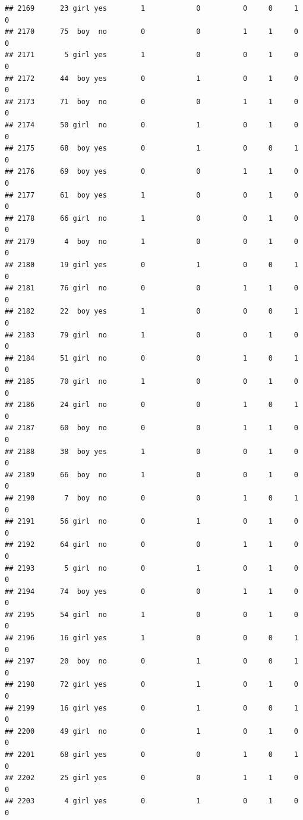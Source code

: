 \documentclass[man]{apa6}
\begin{document}
\begin{verbatim}
## 2169      23 girl yes        1            0          0     0     1     0
## 2170      75  boy  no        0            0          1     1     0     0
## 2171       5 girl yes        1            0          0     1     0     0
## 2172      44  boy yes        0            1          0     1     0     0
## 2173      71  boy  no        0            0          1     1     0     0
## 2174      50 girl  no        0            1          0     1     0     0
## 2175      68  boy yes        0            1          0     0     1     0
## 2176      69  boy yes        0            0          1     1     0     0
## 2177      61  boy yes        1            0          0     1     0     0
## 2178      66 girl  no        1            0          0     1     0     0
## 2179       4  boy  no        1            0          0     1     0     0
## 2180      19 girl yes        0            1          0     0     1     0
## 2181      76 girl  no        0            0          1     1     0     0
## 2182      22  boy yes        1            0          0     0     1     0
## 2183      79 girl  no        1            0          0     1     0     0
## 2184      51 girl  no        0            0          1     0     1     0
## 2185      70 girl  no        1            0          0     1     0     0
## 2186      24 girl  no        0            0          1     0     1     0
## 2187      60  boy  no        0            0          1     1     0     0
## 2188      38  boy yes        1            0          0     1     0     0
## 2189      66  boy  no        1            0          0     1     0     0
## 2190       7  boy  no        0            0          1     0     1     0
## 2191      56 girl  no        0            1          0     1     0     0
## 2192      64 girl  no        0            0          1     1     0     0
## 2193       5 girl  no        0            1          0     1     0     0
## 2194      74  boy yes        0            0          1     1     0     0
## 2195      54 girl  no        1            0          0     1     0     0
## 2196      16 girl yes        1            0          0     0     1     0
## 2197      20  boy  no        0            1          0     0     1     0
## 2198      72 girl yes        0            1          0     1     0     0
## 2199      16 girl yes        0            1          0     0     1     0
## 2200      49 girl  no        0            1          0     1     0     0
## 2201      68 girl yes        0            0          1     0     1     0
## 2202      25 girl yes        0            0          1     1     0     0
## 2203       4 girl yes        0            1          0     1     0     0

\end{verbatim}
\end{document}

